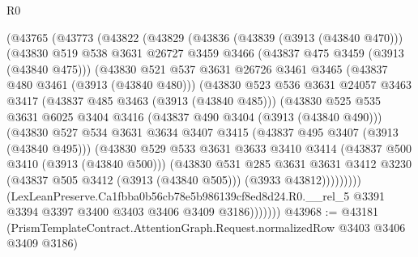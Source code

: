 \begin{lexlean}{R0}
\begin{coremodule}
        (@43765
          (@43773
            (@43822
              (@43829
                (@43836
                  (@43839 (@3913 (@43840 @470)))
                  (@43830
                    @519
                    @538
                    @3631
                    @26727
                    @3459
                    @3466
                    (@43837 @475 @3459 (@3913 (@43840 @475)))
                    (@43830
                      @521
                      @537
                      @3631
                      @26726
                      @3461
                      @3465
                      (@43837 @480 @3461 (@3913 (@43840 @480)))
                      (@43830
                        @523
                        @536
                        @3631
                        @24057
                        @3463
                        @3417
                        (@43837 @485 @3463 (@3913 (@43840 @485)))
                        (@43830
                          @525
                          @535
                          @3631
                          @6025
                          @3404
                          @3416
                          (@43837 @490 @3404 (@3913 (@43840 @490)))
                          (@43830
                            @527
                            @534
                            @3631
                            @3634
                            @3407
                            @3415
                            (@43837 @495 @3407 (@3913 (@43840 @495)))
                            (@43830
                              @529
                              @533
                              @3631
                              @3633
                              @3410
                              @3414
                              (@43837 @500 @3410 (@3913 (@43840 @500)))
                              (@43830
                                @531
                                @285
                                @3631
                                @3631
                                @3412
                                @3230
                                (@43837 @505 @3412 (@3913 (@43840 @505)))
                                (@3933 @43812)))))))))
                (LexLeanPreserve.Ca1fbba0b56cb78e5b986139cf8ed8d24.R0.__rel_5
                  @3391
                  @3394
                  @3397
                  @3400
                  @3403
                  @3406
                  @3409
                  @3186)))))))
@43968 := @43181
    (PrismTemplateContract.AttentionGraph.Request.normalizedRow @3403 @3406 @3409 @3186)

\end{coremodule}
\end{lexlean}
